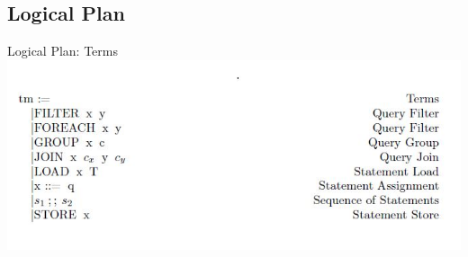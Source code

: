 \subsection{Logical Plan}
\begin{frame}{Logical Plan: Terms}
\centering
\includegraphics[scale=0.6]{Images/Grammar/Terms.JPG}
\end{frame}

